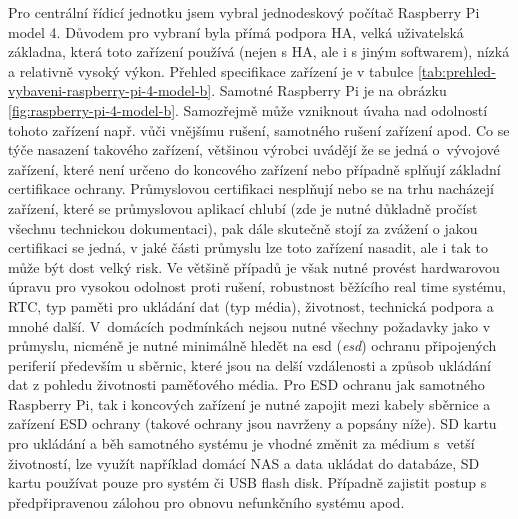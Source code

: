 Pro centrální řídicí jednotku jsem vybral jednodeskový počítač Raspberry Pi model 4. Důvodem pro vybraní byla přímá podpora HA, velká uživatelská základna, která toto zařízení používá (nejen s HA, ale i s jiným softwarem), nízká a relativně vysoký výkon. Přehled specifikace zařízení je v tabulce \ref{tab:prehled-vybaveni-raspberry-pi-4-model-b}. Samotné Raspberry Pi je na obrázku \ref{fig:raspberry-pi-4-model-b}. Samozřejmě může vzniknout úvaha nad odolností tohoto zařízení např. vůči vnějšímu rušení, samotného rušení zařízení apod. Co se týče nasazení takového zařízení, většinou výrobci uvádějí že se jedná o~vývojové zařízení, které není určeno do koncového zařízení nebo případně splňují  základní certifikace ochrany. Průmyslovou certifikaci nesplňují nebo se na trhu nacházejí zařízení, které se průmyslovou aplikací chlubí (zde je nutné důkladně pročíst všechnu technickou dokumentaci), pak dále skutečně stojí za zvážení o jakou certifikaci se jedná, v jaké části průmyslu lze toto zařízení nasadit, ale i tak to může být dost velký risk. Ve většině případů je však nutné provést hardwarovou úpravu pro vysokou odolnost proti rušení, robustnost běžícího real time systému, RTC, typ paměti pro ukládání dat (typ média), životnost, technická podpora a mnohé další. V~domácích podmínkách nejsou nutné všechny požadavky jako v průmyslu, nicméně je nutné minimálně hledět na \acrshort{esd} (\textit{\acrlong{esd}}) ochranu připojených periferií především u sběrnic, které jsou na delší vzdálenosti a způsob ukládání dat z pohledu životnosti paměťového média. Pro ESD ochranu jak samotného Raspberry Pi, tak i koncových zařízení je nutné zapojit mezi kabely sběrnice a zařízení ESD ochrany (takové ochrany jsou navrženy a popsány níže). SD kartu pro ukládání a běh samotného systému je vhodné změnit za médium s~vetší životností, lze využít například domácí NAS a data ukládat do databáze, SD kartu používat pouze pro systém či USB flash disk. Případně zajistit postup s předpřipravenou zálohou pro obnovu nefunkčního systému apod. 

